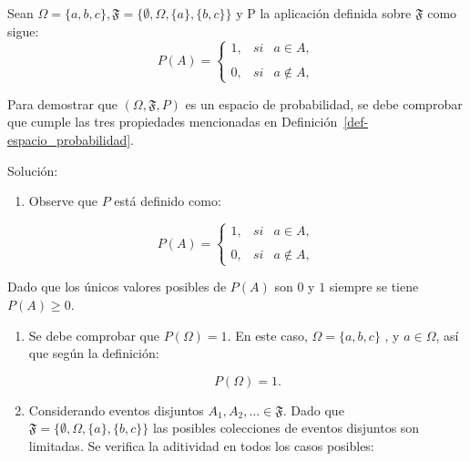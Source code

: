 \documentclass[
  us-letterpaper,
]{scrreprt}
\providecommand{\tightlist}{%
  \setlength{\itemsep}{0pt}\setlength{\parskip}{0pt}}\usepackage{longtable,booktabs,array}
\theoremstyle{plain}
\theoremstyle{plain}
\theoremstyle{definition}
\theoremstyle{remark}
\begin{document}
\begin{tcolorbox}[enhanced jigsaw, titlerule=0mm, opacityback=0, coltitle=black, bottomrule=.15mm, colbacktitle=quarto-callout-caution-color!10!white, toprule=.15mm, colback=white, arc=.35mm, colframe=quarto-callout-caution-color-frame, leftrule=.75mm, bottomtitle=1mm, left=2mm, toptitle=1mm, opacitybacktitle=0.6, breakable, title={Ejemplo (\textbf{\emph{Espacio de probabilidad}})}, rightrule=.15mm]

Sean
\(\Omega = \{a, b, c\}, \mathfrak{F}=\{\emptyset, \Omega, \{a\}, \{b,c\} \}\)
y P la aplicación definida sobre \(\mathfrak{F}\) como sigue:
\[P(A) = \left\{ \begin{array}{lcc} 1, & si & a\in A, \\ \\ 0, & si & a \notin A, \end{array} \right.\]

Para demostrar que \((\Omega, \mathfrak{F}, P)\) es un espacio de
probabilidad, se debe comprobar que cumple las tres propiedades
mencionadas en Definición~\ref{def-espacio_probabilidad}.

Solución:

\begin{enumerate}
\def\labelenumi{\arabic{enumi}.}
\tightlist
\item
  Observe que \(P\) está definido como:
\end{enumerate}

\[
P(A) = \left\{ \begin{array}{lcc} 1, & si & a\in A, \\ \\ 0, & si & a \notin A, \end{array} \right.
\]

Dado que los únicos valores posibles de \(P(A)\) son \(0\) y \(1\)
siempre se tiene \(P(A) \geq 0\).

\begin{enumerate}
\def\labelenumi{\arabic{enumi}.}
\setcounter{enumi}{1}
\item
  Se debe comprobar que \(P(\Omega) = 1\). En este caso,
  \(\Omega = \{a, b, c\}\) , y \(a \in \Omega\), así que según la
  definición:

  \[
  P(\Omega) = 1.
  \]
\item
  Considerando eventos disjuntos \(A_1, A_2, \ldots \in \mathfrak{F}\).
  Dado que \(\mathfrak{F} = \{\emptyset, \Omega, \{a\}, \{b,c\}\}\) las
  posibles colecciones de eventos disjuntos son limitadas. Se verifica
  la aditividad en todos los casos posibles:


\end{enumerate}
\end{tcolorbox}
\end{document}
